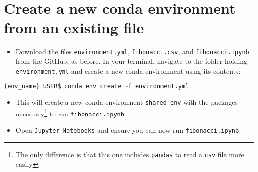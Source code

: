 \documentclass[10pt]{article}
\begin{document}
\section{Create a new conda environment from an existing file}

\begin{itemize}
	\item Download the files \href{https://github.com/m-needham/first_year_programming_sequence/blob/main/1_conda_jupyter/environment.yml}{\lstinline|environment.yml|}, \href{https://github.com/m-needham/first_year_programming_sequence/blob/main/1_conda_jupyter/fibonacci.csv}{\lstinline|fibonacci.csv|}, and \href{https://github.com/m-needham/first_year_programming_sequence/blob/main/1_conda_jupyter/fibonacci.ipynb}{\lstinline|fibonacci.ipynb|} from the GitHub, as before. In your terminal, navigate to the folder holding \lstinline|environment.yml| and create a new conda environment using its contents: 
\end{itemize}


\begin{lstlisting}[language=bash]
	(env_name) USER$ conda env create -f environment.yml 
\end{lstlisting}

\begin{itemize}
	\item This will create a new conda environment \lstinline|shared_env| with the packages necessary\footnote{The only difference is that this one includes \href{https://pandas.pydata.org/}{\lstinline|pandas|} to read a \lstinline|csv| file more easily} to run \lstinline|fibonacci.ipynb|
	\item Open \lstinline|Jupyter Notebooks| and ensure you can now run \lstinline|fibonacci.ipynb|
\end{itemize}
	
\end{document}
